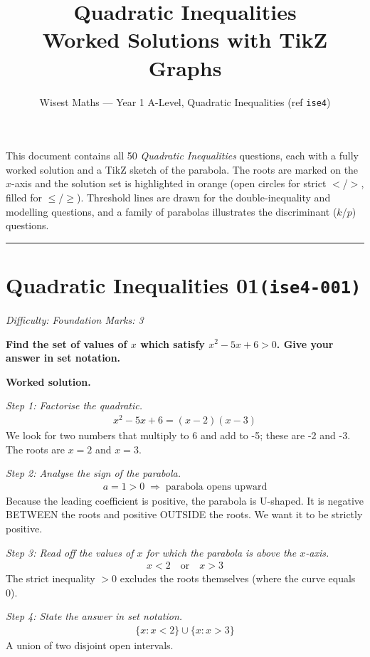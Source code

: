 \documentclass[11pt]{article}
\title{\textbf{Quadratic Inequalities}\\[0.3em]\large Worked Solutions with TikZ Graphs}
\author{Wisest Maths --- Year 1 A-Level, Quadratic Inequalities (ref \texttt{ise4})}
\date{}
\newcommand{\question}[1]{\par\medskip\noindent\textbf{#1}\par}
\begin{document}
\maketitle
\noindent This document contains all 50 \emph{Quadratic Inequalities} questions, each with a
fully worked solution and a TikZ sketch of the parabola. The roots are marked on the \(x\)-axis and the
solution set is highlighted in orange (open circles for strict \(<\)/\(>\), filled for \(\le\)/\(\ge\)).
Threshold lines are drawn for the double-inequality and modelling questions, and a family of parabolas
illustrates the discriminant (\(k\)/\(p\)) questions.
\tableofcontents
\bigskip
\hrule

\section*{Quadratic Inequalities 01\quad\small\texttt{(ise4-001)}}
\textit{Difficulty: Foundation \quad\textbar\quad Marks: 3}

\question{Find the set of values of \( x \) which satisfy \( x^2 - 5x + 6 > 0 \). Give your answer in set notation.}

\textbf{Worked solution.}

\textit{Step 1: Factorise the quadratic.}
\[\begin{gathered}
x^2 - 5x + 6 = (x - 2)(x - 3)
\end{gathered}\]
We look for two numbers that multiply to 6 and add to -5; these are -2 and -3. The roots are \( x = 2 \) and \( x = 3 \).

\textit{Step 2: Analyse the sign of the parabola.}
\[\begin{gathered}
a = 1 > 0 \;\Longrightarrow\; \text{parabola opens upward}
\end{gathered}\]
Because the leading coefficient is positive, the parabola is U-shaped. It is negative BETWEEN the roots and positive OUTSIDE the roots. We want it to be strictly positive.

\textit{Step 3: Read off the values of \( x \) for which the parabola is above the \( x \)-axis.}
\[\begin{gathered}
x < 2 \quad \text{or} \quad x > 3
\end{gathered}\]
The strict inequality \( > 0 \) excludes the roots themselves (where the curve equals 0).

\textit{Step 4: State the answer in set notation.}
\[\begin{gathered}
\{ x : x < 2 \} \cup \{ x : x > 3 \}
\end{gathered}\]
A union of two disjoint open intervals.
\end{document}

